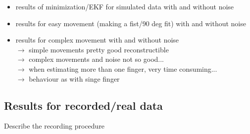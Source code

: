 \begin{itemize}
\begin{itemize}
\item results of minimization/EKF for simulated data with and without noise
\item results for easy movement (making a fist/90 deg fit) with and without noise
\item results for complex movement with and without noise \\
		$ \rightarrow $ simple movements pretty good reconstructible\\
		$ \rightarrow $	complex movements and noise not so good...\\
		$ \rightarrow $ when estimating more than one finger, very time consuming...\\
		$ \rightarrow $	behaviour as with singe finger
\end{itemize}

\end{itemize}



\subsection{Results for recorded/real data} \label{subsec:resMeas}

Describe the recording procedure

